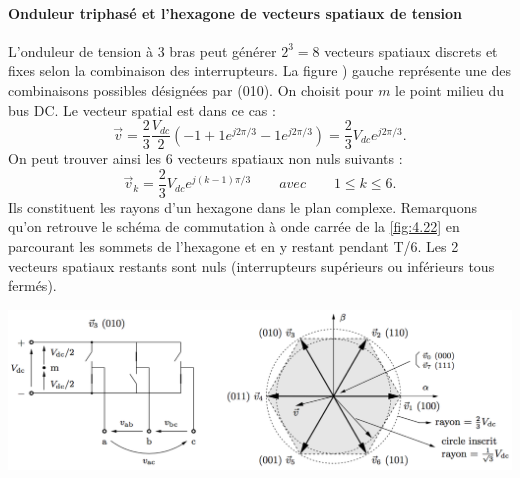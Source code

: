 		\paragraph{Onduleur triphasé et l'hexagone de vecteurs spatiaux de tension} \quad L'onduleur de tension à 3 bras peut générer $2^3 = 8$ vecteurs spatiaux discrets et fixes selon la combinaison des interrupteurs. La figure ) gauche représente une des combinaisons possibles désignées par (010). On choisit pour $m$ le point milieu du bus DC. Le vecteur spatial est dans ce cas :
		\begin{equation}
			\vec{v} = \frac{2}{3} \frac{V_{dc}}{2}(-1 + 1e^{j2\pi /3}-1 e^{j2\pi /3}) = \frac{2}{3}V_{dc}e^{j2\pi /3}.
		\end{equation}
		On peut trouver ainsi les 6 vecteurs spatiaux non nuls suivants :
		\begin{equation}
			\vec{v}_k = \frac{2}{3}V_{dc}e^{j(k-1)\pi /3}\qquad avec \qquad 1\leq k \leq 6.
		\end{equation}
		Ils constituent les rayons d'un hexagone dans le plan complexe. Remarquons qu'on retrouve le schéma de commutation à onde carrée de la \autoref{fig:4.22} en parcourant les sommets de l'hexagone et en y restant pendant T/6. Les 2 vecteurs spatiaux restants sont nuls (interrupteurs supérieurs ou inférieurs tous fermés). 
		\begin{center}
		\includegraphics[scale=0.4]{ch4/29}
		\label{fig:4.27}
		\end{center}
		
